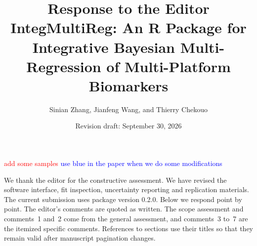 \documentclass[11pt]{article}
\title{Response to the Editor\\
\large IntegMultiReg: An R Package for Integrative Bayesian
Multi-Regression of Multi-Platform Biomarkers}
\author{Sinian Zhang, Jianfeng Wang, and Thierry Chekouo}
\date{Revision draft: September 30, 2026}
\begin{document}
\maketitle

\textcolor{red}{add some samples}
\textcolor{blue}{use blue in the paper when we do some modifications}



We thank the editor for the constructive assessment. We have revised the
software interface, fit inspection, uncertainty reporting and replication
materials. The current submission uses package version 0.2.0. Below we respond
point by point. The editor's comments are quoted as written. The scope
assessment and comments~1 and~2 come from the general assessment, and
comments~3 to~7 are the itemized specific comments. References to sections use their titles so that they remain valid
after manuscript pagination changes.
\end{document}
